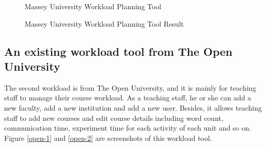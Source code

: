 \documentclass[fyp]{socreport}
\begin{document}
\begin{figure}
\caption{Massey University Workload Planning Tool}
\label{massey-1}
\end{figure}

\begin{figure}
\caption{Massey University Workload Planning Tool Result}
\label{massey-2}
\end{figure}

\subsection{An existing workload tool from The Open University}
The second workload is from The Open University, and it is mainly for teaching staff to manage their course workload. As a teaching staff, he or she can add a new faculty, add a new institution and add a new user. Besides, it allows teaching staff to add new courses and edit course details including word count, communication time, experiment time for each activity of each unit and so on. Figure {\ref{open-1}} and {\ref{open-2}} are screenshots of this workload tool.
\end{document}
